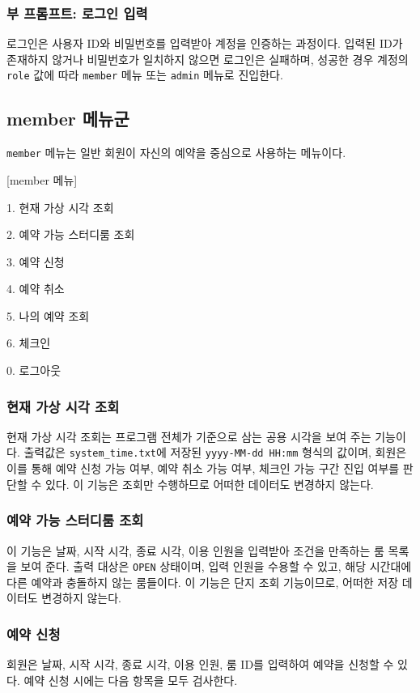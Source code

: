 \documentclass[a4paper,10pt]{article}
\begin{document}
\subsubsection{부 프롬프트: 로그인 입력}
로그인은 사용자 ID와 비밀번호를 입력받아 계정을 인증하는 과정이다. 입력된 ID가 존재하지 않거나 비밀번호가 일치하지 않으면 로그인은 실패하며, 성공한 경우 계정의 \texttt{role} 값에 따라 \texttt{member} 메뉴 또는 \texttt{admin} 메뉴로 진입한다.

\subsection{member 메뉴군}
\texttt{member} 메뉴는 일반 회원이 자신의 예약을 중심으로 사용하는 메뉴이다.

\begin{menubox}
\small
[member 메뉴]\par
1. 현재 가상 시각 조회\par
2. 예약 가능 스터디룸 조회\par
3. 예약 신청\par
4. 예약 취소\par
5. 나의 예약 조회\par
6. 체크인\par
0. 로그아웃
\end{menubox}

\subsubsection{현재 가상 시각 조회}
현재 가상 시각 조회는 프로그램 전체가 기준으로 삼는 공용 시각을 보여 주는 기능이다. 출력값은 \texttt{system\_time.txt}에 저장된 \texttt{yyyy-MM-dd HH:mm} 형식의 값이며, 회원은 이를 통해 예약 신청 가능 여부, 예약 취소 가능 여부, 체크인 가능 구간 진입 여부를 판단할 수 있다. 이 기능은 조회만 수행하므로 어떠한 데이터도 변경하지 않는다.

\subsubsection{예약 가능 스터디룸 조회}
이 기능은 날짜, 시작 시각, 종료 시각, 이용 인원을 입력받아 조건을 만족하는 룸 목록을 보여 준다. 출력 대상은 \texttt{OPEN} 상태이며, 입력 인원을 수용할 수 있고, 해당 시간대에 다른 예약과 충돌하지 않는 룸들이다. 이 기능은 단지 조회 기능이므로, 어떠한 저장 데이터도 변경하지 않는다.

\subsubsection{예약 신청}
회원은 날짜, 시작 시각, 종료 시각, 이용 인원, 룸 ID를 입력하여 예약을 신청할 수 있다. 예약 신청 시에는 다음 항목을 모두 검사한다.
\end{document}
